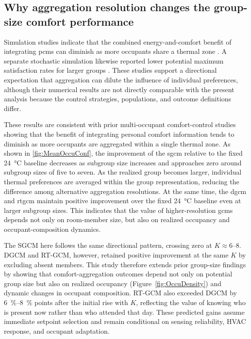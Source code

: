 
\subsection{Why aggregation resolution changes the group-size comfort performance}
Simulation studies indicate that the combined energy-and-comfort benefit of integrating \acp{pcm} can diminish as more occupants share a thermal zone \cite{jung_energy_2020}. A separate stochastic simulation likewise reported lower potential maximum satisfaction rates for larger groups \cite{wang_enhancing_2026}.
These studies support a directional expectation that aggregation can dilute the influence of individual preferences, although their numerical results are not directly comparable with the present analysis because the control strategies, populations, and outcome definitions differ.

These results are consistent with prior multi-occupant comfort-control studies showing that the benefit of integrating personal comfort information tends to diminish as more occupants are aggregated within a single thermal zone.
As shown in \autoref{fig:MeanOccuConf}, the improvement of the \ac{sgcm} relative to the fixed \qty{24}{\celsius} baseline decreases as subgroup size increases and approaches zero around subgroup sizes of five to seven.
As the realized group becomes larger, individual thermal preferences are averaged within the group representation, reducing the difference among alternative aggregation resolutions.
At the same time, the \ac{dgcm} and \ac{rtgcm} maintain positive improvement over the fixed \qty{24}{\celsius} baseline even at larger subgroup sizes.
This indicates that the value of higher-resolution \acp{gcm} depends not only on room-member size, but also on realized occupancy and occupant-composition dynamics.

The SGCM here follows the same directional pattern, crossing zero at $K\approx6$--8.
DGCM and RT-GCM, however, retained positive improvement at the same $K$ by excluding absent members.
This study therefore extends prior group-size findings by showing that comfort-aggregation outcomes depend not only on potential group size but also on realized occupancy (Figure~\ref{fig:OccuDensity}) and dynamic changes in occupant composition.
RT-GCM also exceeded DGCM by \qtyrange{6}{8}{\percent} points after the initial rise with $K$, reflecting the value of knowing who is present now rather than who attended that day.
These predicted gains assume immediate setpoint selection and remain conditional on sensing reliability, HVAC response, and occupant adaptation.

